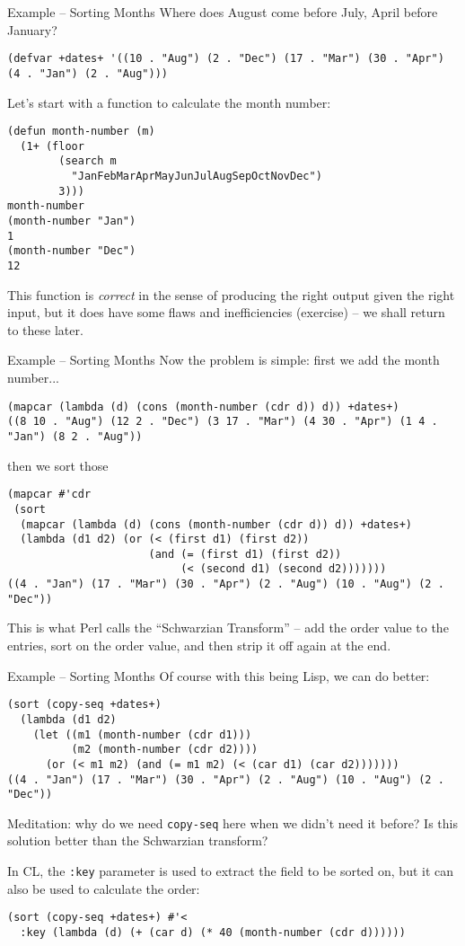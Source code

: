 \documentclass[presentation]{beamer}
\begin{document}
\begin{frame}[fragile]{Example -- Sorting Months}
Where does August come before July, April before January?
\begin{verbatim}
(defvar +dates+ '((10 . "Aug") (2 . "Dec") (17 . "Mar") (30 . "Apr") (4 . "Jan") (2 . "Aug")))
\end{verbatim}
Let's start with a function to calculate the month number:
\begin{verbatim}
(defun month-number (m)
  (1+ (floor
        (search m
          "JanFebMarAprMayJunJulAugSepOctNovDec")
        3)))
month-number
(month-number "Jan")
1
(month-number "Dec")
12
\end{verbatim}
This function is \emph{correct} in the sense of producing the right output given the right input, but it does have some flaws and inefficiencies (exercise) -- we shall return to these later.
\end{frame}

\begin{frame}[fragile]{Example -- Sorting Months}
Now the problem is simple: first we add the month number...
\begin{verbatim}
(mapcar (lambda (d) (cons (month-number (cdr d)) d)) +dates+)
((8 10 . "Aug") (12 2 . "Dec") (3 17 . "Mar") (4 30 . "Apr") (1 4 . "Jan") (8 2 . "Aug"))
\end{verbatim}
then we sort those
\begin{verbatim}
(mapcar #'cdr
 (sort
  (mapcar (lambda (d) (cons (month-number (cdr d)) d)) +dates+)
  (lambda (d1 d2) (or (< (first d1) (first d2))
                      (and (= (first d1) (first d2))
                           (< (second d1) (second d2)))))))
((4 . "Jan") (17 . "Mar") (30 . "Apr") (2 . "Aug") (10 . "Aug") (2 . "Dec"))
\end{verbatim}
This is what Perl calls the ``Schwarzian Transform'' -- add the order
value to the entries, sort on the order value, and then strip it off
again at the end.
\end{frame}

\begin{frame}[fragile]{Example -- Sorting Months}
Of course with this being Lisp, we can do better:
\begin{verbatim}
(sort (copy-seq +dates+)
  (lambda (d1 d2)
    (let ((m1 (month-number (cdr d1)))
          (m2 (month-number (cdr d2))))
      (or (< m1 m2) (and (= m1 m2) (< (car d1) (car d2)))))))
((4 . "Jan") (17 . "Mar") (30 . "Apr") (2 . "Aug") (10 . "Aug") (2 . "Dec"))
\end{verbatim}
Meditation: why do we need \texttt{copy-seq} here when we didn't need it before?
 Is this solution better than the Schwarzian transform?

\medskip
In CL, the \texttt{:key} parameter is used to extract the field to be sorted on, but it can also be used to calculate the order:
\begin{verbatim}
(sort (copy-seq +dates+) #'<
  :key (lambda (d) (+ (car d) (* 40 (month-number (cdr d))))))
\end{verbatim}

\end{frame}
\end{document}
